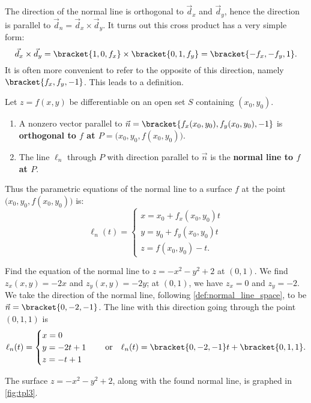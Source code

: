 The direction of the normal line is orthogonal to $\vec d_x$ and $\vec d_y$, hence the direction is parallel to $\vec d_n = \vec d_x\times \vec d_y$. It turns out this cross product has a very simple form:
\[ \vec d_x\times \vec d_y =\bracket{1,0,f_x}\times\bracket{0,1,f_y}=\bracket{-f_x,-f_y,1}.\]
It is often more convenient to refer to the opposite of this direction, namely $\bracket{f_x,f_y,-1}$. This leads to a definition.


\begin{definition}\label{def:normal_line_space}
Let $z=f(x,y)$ be differentiable on an open set $S$ containing $(x_0,y_0)$.

\begin{enumerate}
\item	A nonzero vector parallel to $\vec n=\bracket{f_x(x_0,y_0),f_y(x_0,y_0),-1}$ is \textbf{orthogonal to $f$ at $P=\bigl(x_0,y_0,f(x_0,y_0)\bigr)$}.

\item The line $\ell_n$ through $P$ with direction parallel to $\vec n$ is the \textbf{normal line to $f$ at $P$}.
\end{enumerate}
\end{definition}

Thus the parametric equations of the normal line to a surface $f$ at the point $\bigl(x_0,y_0,f(x_0,y_0)\bigr)$ is:
\[
\ell_{n}(t) =
\begin{cases}
x = x_0 + f_x(x_0,y_0)t \\
y = y_0 + f_y(x_0,y_0)t \\
z = f(x_0,y_0) - t.
\end{cases}
\]

\begin{example}\label{ex_tpl3}
Find the equation of the normal line to $z=-x^2-y^2+2$ at $(0,1)$.
\solution
We find $z_x(x,y) = -2x$ and $z_y(x,y) = -2y$; at $(0,1)$, we have $z_x = 0$ and $z_y = -2$. We take the direction of the normal line, following \autoref{def:normal_line_space}, to be $\vec n=\bracket{0,-2,-1}$. The line with this direction going through the point $(0,1,1)$ is 
%
%
\[
\ell_n(t) = \begin{cases}x=0\\y=-2t+1\\z=-t+1\end{cases}
\quad \text{or}\quad
\ell_n(t)=\bracket{0,-2,-1}t+\bracket{0,1,1}.
\]

The surface $z=-x^2-y^2+2$, along with the found normal line, is graphed in \autoref{fig:tpl3}.
\end{example}

